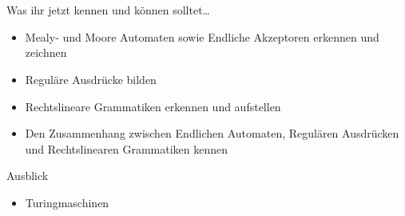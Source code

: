 \section{}
	\begin{frame}{Was ihr jetzt kennen und können solltet\dots}
			\begin{itemize}
				\item Mealy- und Moore Automaten sowie Endliche Akzeptoren erkennen und zeichnen
				\item Reguläre Ausdrücke bilden
				\item Rechtslineare Grammatiken erkennen und aufstellen
				\item Den Zusammenhang zwischen Endlichen Automaten, Regulären Ausdrücken und Rechtslinearen Grammatiken kennen
			\end{itemize}
	\end{frame}
	\begin{frame}{Ausblick}
		\begin{itemize}
			\item Turingmaschinen
		\end{itemize}
	\end{frame}
\section{}
\questionframe
\lastframe
{}
